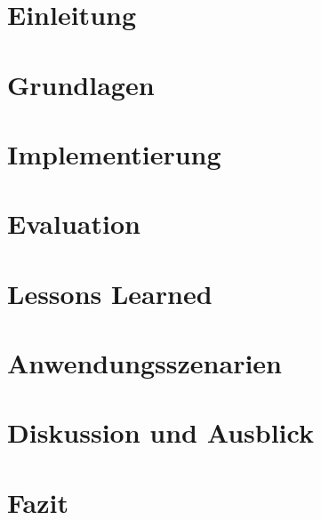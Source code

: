 \mainmatter

\chapter{Einleitung}\label{chap:introduction}


\chapter{Grundlagen}\label{chap:basics}


%

\chapter{Implementierung}\label{chap:implementation}


\chapter{Evaluation}\label{chap:evaluation}


\chapter{Lessons Learned}\label{chap:lessons_learned}


\chapter{Anwendungsszenarien}\label{chap:application_scenarios}


\chapter{Diskussion und Ausblick}\label{chap:discussion}



\chapter{Fazit}\label{chap:conclusion}

%
